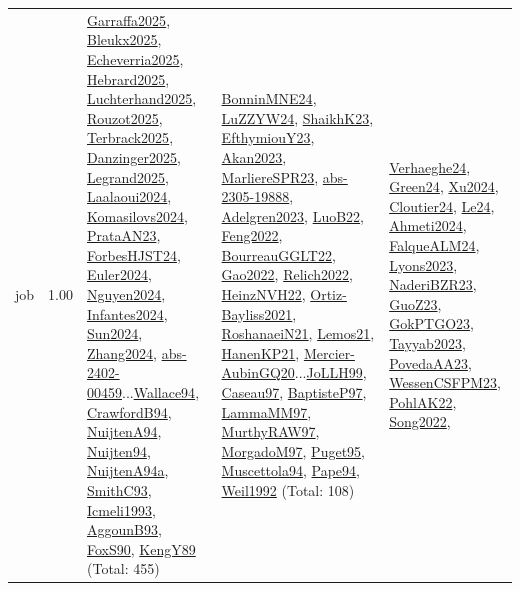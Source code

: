 {\begin{longtable}{p{3cm}r>{\raggedright\arraybackslash}p{6cm}>{\raggedright\arraybackslash}p{6cm}>{\raggedright\arraybackslash}p{8cm}}
\index{job}\index{Scheduling!job}job &  1.00 & \hyperref[detail:Garraffa2025]{Garraffa2025}, \hyperref[detail:Bleukx2025]{Bleukx2025}, \hyperref[detail:Echeverria2025]{Echeverria2025}, \hyperref[detail:Hebrard2025]{Hebrard2025}, \hyperref[detail:Luchterhand2025]{Luchterhand2025}, \hyperref[detail:Rouzot2025]{Rouzot2025}, \hyperref[detail:Terbrack2025]{Terbrack2025}, \hyperref[detail:Danzinger2025]{Danzinger2025}, \hyperref[detail:Legrand2025]{Legrand2025}, \hyperref[detail:Laalaoui2024]{Laalaoui2024}, \hyperref[detail:Komasilovs2024]{Komasilovs2024}, \hyperref[detail:PrataAN23]{PrataAN23}, \hyperref[detail:ForbesHJST24]{ForbesHJST24}, \hyperref[detail:Euler2024]{Euler2024}, \hyperref[detail:Nguyen2024]{Nguyen2024}, \hyperref[detail:Infantes2024]{Infantes2024}, \hyperref[detail:Sun2024]{Sun2024}, \hyperref[detail:Zhang2024]{Zhang2024}, \hyperref[detail:abs-2402-00459]{abs-2402-00459}...\hyperref[detail:Wallace94]{Wallace94}, \hyperref[detail:CrawfordB94]{CrawfordB94}, \hyperref[detail:NuijtenA94]{NuijtenA94}, \hyperref[detail:Nuijten94]{Nuijten94}, \hyperref[detail:NuijtenA94a]{NuijtenA94a}, \hyperref[detail:SmithC93]{SmithC93}, \hyperref[detail:Icmeli1993]{Icmeli1993}, \hyperref[detail:AggounB93]{AggounB93}, \hyperref[detail:FoxS90]{FoxS90}, \hyperref[detail:KengY89]{KengY89} (Total: 455) & \hyperref[detail:BonninMNE24]{BonninMNE24}, \hyperref[detail:LuZZYW24]{LuZZYW24}, \hyperref[detail:ShaikhK23]{ShaikhK23}, \hyperref[detail:EfthymiouY23]{EfthymiouY23}, \hyperref[detail:Akan2023]{Akan2023}, \hyperref[detail:MarliereSPR23]{MarliereSPR23}, \hyperref[detail:abs-2305-19888]{abs-2305-19888}, \hyperref[detail:Adelgren2023]{Adelgren2023}, \hyperref[detail:LuoB22]{LuoB22}, \hyperref[detail:Feng2022]{Feng2022}, \hyperref[detail:BourreauGGLT22]{BourreauGGLT22}, \hyperref[detail:Gao2022]{Gao2022}, \hyperref[detail:Relich2022]{Relich2022}, \hyperref[detail:HeinzNVH22]{HeinzNVH22}, \hyperref[detail:Ortiz-Bayliss2021]{Ortiz-Bayliss2021}, \hyperref[detail:RoshanaeiN21]{RoshanaeiN21}, \hyperref[detail:Lemos21]{Lemos21}, \hyperref[detail:HanenKP21]{HanenKP21}, \hyperref[detail:Mercier-AubinGQ20]{Mercier-AubinGQ20}...\hyperref[detail:JoLLH99]{JoLLH99}, \hyperref[detail:Caseau97]{Caseau97}, \hyperref[detail:BaptisteP97]{BaptisteP97}, \hyperref[detail:LammaMM97]{LammaMM97}, \hyperref[detail:MurthyRAW97]{MurthyRAW97}, \hyperref[detail:MorgadoM97]{MorgadoM97}, \hyperref[detail:Puget95]{Puget95}, \hyperref[detail:Muscettola94]{Muscettola94}, \hyperref[detail:Pape94]{Pape94}, \hyperref[detail:Weil1992]{Weil1992} (Total: 108) & \hyperref[detail:Verhaeghe24]{Verhaeghe24}, \hyperref[detail:Green24]{Green24}, \hyperref[detail:Xu2024]{Xu2024}, \hyperref[detail:Cloutier24]{Cloutier24}, \hyperref[detail:Le24]{Le24}, \hyperref[detail:Ahmeti2024]{Ahmeti2024}, \hyperref[detail:FalqueALM24]{FalqueALM24}, \hyperref[detail:Lyons2023]{Lyons2023}, \hyperref[detail:NaderiBZR23]{NaderiBZR23}, \hyperref[detail:GuoZ23]{GuoZ23}, \hyperref[detail:GokPTGO23]{GokPTGO23}, \hyperref[detail:Tayyab2023]{Tayyab2023}, \hyperref[detail:PovedaAA23]{PovedaAA23}, \hyperref[detail:WessenCSFPM23]{WessenCSFPM23}, \hyperref[detail:PohlAK22]{PohlAK22}, \hyperref[detail:Song2022]{Song2022}, 
\end{longtable}}
